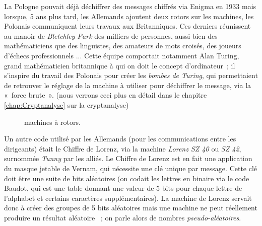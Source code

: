 La Pologne pouvait déjà déchiffrer des messages chiffrés via Enigma en
1933 mais lorsque, 5 ans plus tard, les Allemands ajoutent deux rotors
sur les machines, les Polonais communiquent leurs travaux aux
Britanniques. Ces derniers réunissent au manoir de \emph{Bletchley
Park} des milliers de
personnes, aussi bien des mathématiciens que des linguistes, des
amateurs de mots croisés, des joueurs d'échecs professionnels ...
Cette équipe comportait notamment Alan Turing, grand mathématicien
britannique à qui on doit le concept d'ordinateur~; il s'inspire du
travail des Polonais pour créer les \emph{bombes de Turing}, qui
permettaient de retrouver le réglage de la machine à utiliser pour
déchiffrer le message, via la «~force brute~». (nous verrons ceci plus
en détail dans le chapitre \ref{chap:Cryptanalyse} sur la
cryptanalyse) \\

\begin{figure}[h]
  \begin{center}
    \hspace{1.5cm}
  \end{center}
  \vspace{-10pt}
  \caption{machines à rotors.}
  \vspace{-10pt}
\end{figure}


Un autre code utilisé par les Allemands (pour les communications entre
les dirigeants) était le Chiffre de Lorenz, via la machine
\emph{Lorenz SZ 40} ou \emph{SZ 42}, surnommée \emph{Tunny} par les alliés. Le
Chiffre de Lorenz est en fait une application du masque jetable de
Vernam, qui nécessite une clé unique par message. Cette clé doit
être une suite de bits aléatoires (on codait les lettres en binaire
via le code Baudot, qui est une table donnant une valeur de 5 bits
pour chaque lettre de l'alphabet et certains caractères
supplémentaires). La machine de Lorenz servait donc à créer des
groupes de 5 bits aléatoires mais une machine ne peut réellement
produire un résultat aléatoire ~; on parle alors de nombres
\emph{pseudo-aléatoires}.


